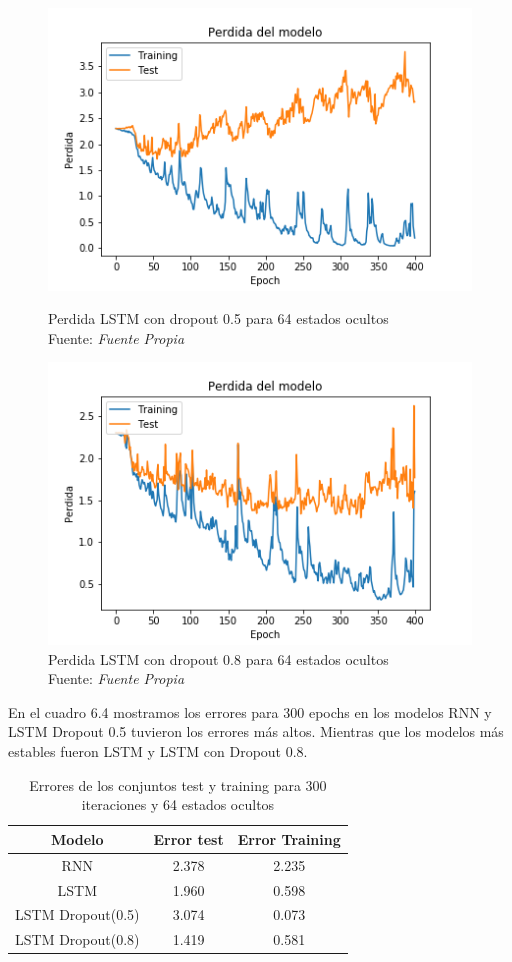 \begin{figure}[H]
	\centering
	\includegraphics[width=0.7\linewidth]{Figures/lstm_64_05_cost}
	\caption{Perdida LSTM con dropout 0.5 para 64 estados ocultos\\ Fuente: {\textit{Fuente Propia}}}
	\label{fig:lstm6405cost}
	\centering
	\includegraphics[width=0.7\linewidth]{Figures/lstm_64_08_cost}
	\caption{Perdida LSTM con dropout 0.8 para 64 estados ocultos\\ Fuente: {\textit{Fuente Propia}}}
	\label{fig:lstm6408cost}
\end{figure}

 En el cuadro 6.4 mostramos los errores para 300 epochs en los modelos RNN y LSTM Dropout 0.5 tuvieron los errores más altos.	Mientras que los modelos más estables fueron LSTM y LSTM con Dropout 0.8. 
\begin{table}[H]
	\centering
	\begin{tabular}{|c|c|c|}
		\hline
		\rowcolor{Gray}  Modelo & Error test& Error Training \\ \hline
		RNN &        2.378  &             2.235       \\ \hline
		LSTM &        1.960 &          0.598     \\ \hline
		LSTM Dropout(0.5) &  3.074         &    0.073        \\ \hline
		LSTM Dropout(0.8) &	1.419		&	0.581	\\ \hline
	\end{tabular}
	\caption{Errores de los conjuntos test y training para 300 iteraciones y 64 estados ocultos}
\end{table}


